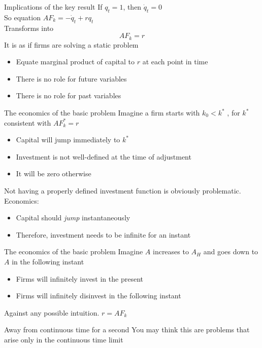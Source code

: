 \documentclass[11pt,aspectratio=169,xcolor={dvipsnames},hyperref={pdftex,pdfpagemode=UseNone,hidelinks,pdfdisplaydoctitle=true},usepdftitle=false]{beamer}
\begin{document}
\begin{frame}{Implications of the key result}
If $q_t = 1$, then $\dot{q}_t = 0$\\
\pause
So equation $A F_k = - \dot{q}_t + r q_t$\\
\pause
Transforms into
\pause
$$A F_k = r $$
It is as if firms are solving a static problem
\pause
\begin{itemize}
\item Equate marginal product of capital to $r$ at each point in time
\pause
\item There is no role for future variables
\pause
\item There is no role for past variables
\end{itemize}
\end{frame}

\begin{frame}{The economics of the basic problem}
Imagine a firm starts with $k_0 < k^*$ , for $k^*$ consistent with $AF_k^* = r$
\pause
\begin{itemize}
\item Capital will jump immediately to $k^*$
\pause
\item Investment is not well-defined at the time of adjustment
\pause
\item It will be zero otherwise
\end{itemize}
\pause
Not having a properly defined investment function is obviously problematic. Economics:
\begin{itemize}
\pause
\item Capital should \textit{jump} instantaneously
\pause
\item Therefore, investment needs to be infinite for an instant
\end{itemize}
\end{frame}


\begin{frame}{The economics of the basic problem}
Imagine $A$ increases to $A_H$ and goes down to $A$ in the following instant
\begin{itemize}
\item Firms will infinitely invest in the present
\pause
\item Firms will infinitely disinvest in the following instant
\end{itemize}
Against any possible intuition. $r = A F_k$
\end{frame}

\begin{frame}{Away from continuous time for a second}
You may think this are problems that arise only in the continuous time limit
\end{frame}
\end{document}
